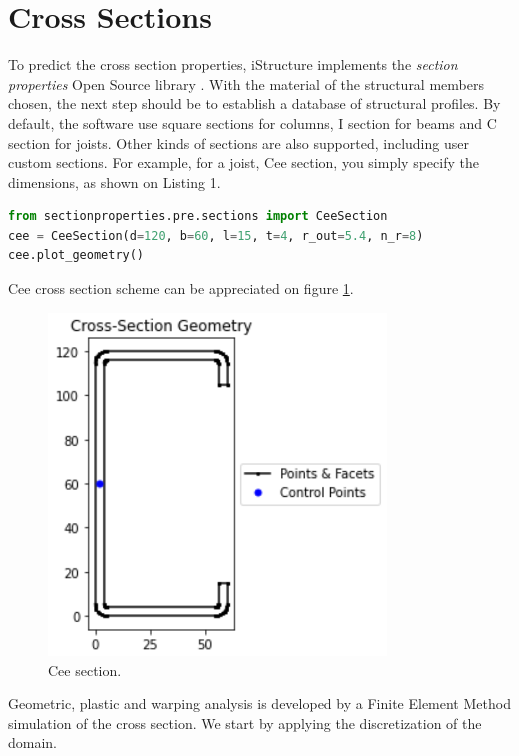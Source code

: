\section{Cross Sections}

To predict the cross section properties, iStructure implements the \textit{section properties} Open Source library \cite{secprop}. With the material of the structural members chosen, the next step should be to establish a database of structural profiles. By default, the software use square sections for columns, I section for beams and C section for joists. Other kinds of sections are also supported, including user custom sections. For example, for a joist, Cee section, you simply specify the dimensions, as shown on Listing 1.

\begin{lstlisting}[language=Python, caption=Cee section definition]
from sectionproperties.pre.sections import CeeSection
cee = CeeSection(d=120, b=60, l=15, t=4, r_out=5.4, n_r=8)
cee.plot_geometry()
\end{lstlisting}

Cee cross section scheme can be appreciated on figure \ref{cScheme}.

\begin{figure}[h!]
\centering
\includegraphics[width=0.8\textwidth]{Images/sections/cee.PNG}
\caption{Cee section.}
\label{cScheme}
\end{figure}

Geometric, plastic and warping analysis is developed by a Finite Element Method simulation of the cross section. We start by applying the discretization of the domain.

